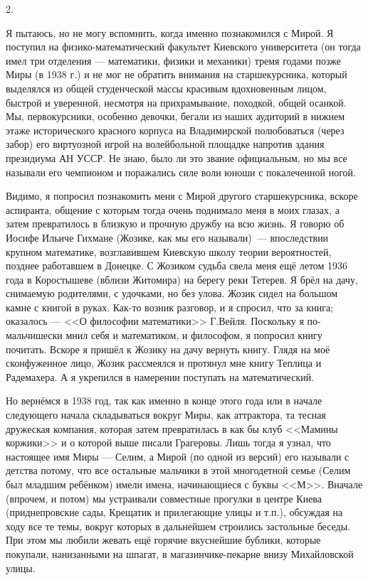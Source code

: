2.

Я пытаюсь, но не могу вспомнить, когда именно познакомился с Мирой. Я поступил на физико-математический факультет Киевского университета (он тогда имел три отделения --- математики, физики и механики) тремя годами позже Миры (в 1938 г.) и не мог не обратить внимания на старшекурсника, который выделялся из общей студенческой массы красивым вдохновенным лицом, быстрой и уверенной, несмотря на прихрамывание, походкой, общей осанкой. Мы, первокурсники, особенно девочки, бегали из наших аудиторий в нижнем этаже исторического красного корпуса на Владимирской полюбоваться (через забор) его виртуозной игрой на волейбольной площадке напротив здания президиума АН УССР. Не знаю, было ли это звание официальным, но мы все называли его чемпионом и поражались силе воли юноши с покалеченной ногой.

Видимо, я попросил познакомить меня с Мирой другого старшекурсника, вскоре аспиранта, общение с которым тогда очень поднимало меня в моих глазах, а затем превратилось в близкую и прочную дружбу на всю жизнь. Я говорю об Иосифе Ильиче Гихмане (Жозике, как мы его называли)~--- впоследствии крупном математике, возглавившем Киевскую школу теории вероятностей, позднее работавшем в Донецке. С Жозиком судьба свела меня ещё летом 1936 года в Коростышеве (вблизи Житомира) на берегу реки Тетерев. Я брёл на дачу, снимаемую родителями, с удочками, но без улова. Жозик сидел на большом камне с книгой в руках. Как-то возник разговор, и я спросил, что за книга; оказалось --- <<О философии математики>> Г.Вейля. Поскольку я по-мальчишески мнил себя и математиком, и философом, я попросил книгу почитать. Вскоре я пришёл к Жозику на дачу вернуть книгу. Глядя на моё сконфуженное лицо, Жозик рассмеялся и протянул мне книгу Теплица и Радемахера. А я укрепился в намерении поступать на математический.

Но вернёмся в 1938 год, так как именно в конце этого года или в начале следующего начала складываться вокруг Миры, как аттрактора, та тесная дружеская компания, которая затем превратилась в как бы клуб <<Мамины коржики>> и о которой выше писали Грагеровы. Лишь тогда я узнал, что настоящее имя Миры --- Селим, а Мирой (по одной из версий) его называли с детства потому, что все остальные мальчики в этой многодетной семье (Селим был младшим ребёнком) имели имена, начинающиеся с буквы <<М>>. Вначале (впрочем, и потом) мы устраивали совместные прогулки в центре Киева (приднепровские сады, Крещатик и прилегающие улицы и т.п.), обсуждая на ходу все те темы, вокруг которых в дальнейшем строились застольные беседы. При этом мы любили жевать ещё горячие вкуснейшие бублики, которые покупали, нанизанными на шпагат, в магазинчике-пекарне внизу Михайловской улицы.

